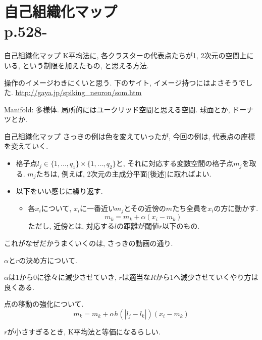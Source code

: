\documentclass[dvipdfmx,8pt]{beamer}
\begin{document}
  \section{自己組織化マップ\\p.528-}
  \begin{frame}{自己組織化マップ}
    K平均法に, 各クラスターの代表点たちが1, 2次元の空間上にいる, という制限を加えたもの, と思える方法.

    操作のイメージわきにくいと思う. 下のサイト, イメージ持つにはよさそうでした.
    \url{http://gaya.jp/spiking_neuron/som.htm}

    Manifold: 多様体. 局所的にはユークリッド空間と思える空間. 球面とか, ドーナツとか.
  \end{frame}
  \begin{frame}{自己組織化マップ}
    さっきの例は色を変えていったが, 今回の例は, 代表点の座標を変えていく.

    \begin{itemize}
      \item 格子点$l_j\in\{1,\dots,q_1\}\times\{1,\dots,q_2\}$と,
        それに対応する変数空間の格子点$m_j$を取る.
        $m_j$たちは, 例えば, 2次元の主成分平面(後述)に取ればよい.
      \item 以下をいい感じに繰り返す.
      \begin{itemize}
        \item 各$x_i$について, $x_i$に一番近い$m_j$とその近傍の$m$たち全員を$x_i$の方に動かす.
          \[
            m_k = m_k + \alpha(x_i-m_k)
          \]
          ただし, 近傍とは, 対応する$l$の距離が閾値$r$以下のもの.
      \end{itemize}
    \end{itemize}
    これがなぜだかうまくいくのは, さっきの動画の通り.

    $\alpha$と$r$の決め方について.

    $\alpha$は$1$から$0$に徐々に減少させていき,
    $r$は適当な$R$から$1$へ減少させていくやり方は良くある.

    点の移動の強化について.
    \[
      m_k = m_k + \alpha h(|l_j-l_k|)(x_i-m_k)
    \]

    $r$が小さすぎるとき, K平均法と等価になるらしい.
  \end{frame}
\end{document}
